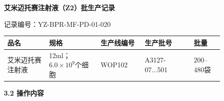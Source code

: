 \documentclass[UTF8,10pt,a4paper,fontset=fandol]{ctexart}
\newcommand{\fieldvalue}[1]{#1}
\newcommand{\handwritten}[1]{#1}
\begin{document}
\newpage

\begin{center}
\textbf{艾米迈托赛注射液（Z2）批生产记录}
\end{center}

\noindent
记录编号：YZ-BPR-MF-PD-01-020

\begin{tabular}{|p{0.17\linewidth}|p{0.21\linewidth}|p{0.18\linewidth}|p{0.20\linewidth}|p{0.12\linewidth}|}
\hline
品名 & 规格 & 生产线编号 & 生产批号 & 批量 \\
\hline
艾米迈托赛注射液 & 12ml；$6.0\times 10^{9}$个细胞 &
\fieldvalue{\handwritten{WOP102}} &
\fieldvalue{\handwritten{A3127-07...501}} &
200--480袋 \\
\hline
\end{tabular}

\vspace{0.3em}
\textbf{3.2 操作内容}
\end{document}
